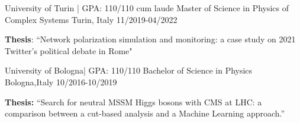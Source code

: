 

\begin{cventries}
  \cventry
    {University of Turin | GPA: 110/110 cum laude} %
    {Master of Science in Physics of Complex Systems} %
    {Turin, Italy} %
    {11/2019-04/2022} %
    {
      \begin{cvpublications} %
         \item {\textbf{Thesis}: ``Network polarization simulation and monitoring: a case study on 2021 Twitter’s political debate in Rome"}
      \end{cvpublications}
      \vspace{0.5mm}
    }
    
    
  \cventry
    {University of Bologna| GPA: 110/110}
 {Bachelor of Science in Physics }%
    {Bologna,Italy} %
    {10/2016-10/2019} %
    {
      \begin{cvpublications} %
         \item {\textbf{Thesis:} ``Search for neutral MSSM Higgs bosons with CMS at LHC: a comparison between a cut-based analysis and a Machine Learning approach.''}
      \end{cvpublications}
    }
    

\end{cventries}
